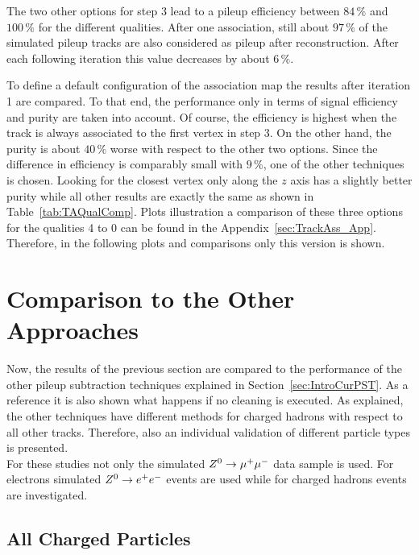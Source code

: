The two other options for step 3 lead to a pileup efficiency between $84\,\%$ and $100\,\%$ for the different qualities. After one association, still about $97\,\%$ of the simulated pileup tracks are also considered as pileup after reconstruction. After each following iteration this value decreases by about $6\,\%$.

To define a default configuration of the association map the results after iteration 1 are compared. To that end, the performance only in terms of signal efficiency and purity are taken into account. Of course, the efficiency is highest when the track is always associated to the first vertex in step 3. On the other hand, the purity is about $40\,\%$ worse with respect to the other two options. Since the difference in efficiency is comparably small with $9\,\%$, one of the other techniques is chosen. Looking for the closest vertex only along the $z$ axis has a slightly better purity while all other results are exactly the same as shown in Table~\ref{tab:TAQualComp}. Plots illustration a comparison of these three options for the qualities 4 to 0 can be found in the Appendix~\ref{sec:TrackAss_App}.  Therefore, in the following plots and comparisons only this version is shown.

\section{Comparison to the Other Approaches \label{sec:TASEFRDA}}

Now, the results of the previous section are compared to the performance of the other pileup subtraction techniques explained in Section~\ref{sec:IntroCurPST}. As a reference it is also shown what happens if no cleaning is executed. As explained, the other techniques have different methods for charged hadrons with respect to all other tracks. Therefore, also an individual validation of different particle types is presented. \\
For these studies not only the simulated ${Z^{0}}\rightarrow\mu^+\mu^-$ data sample is used. For electrons simulated ${Z^{0}}\rightarrow e^+e^-$ events are used while for charged hadrons \ttbar events are investigated.

\subsection{All Charged Particles \label{sec:TASEFRDACP}}

